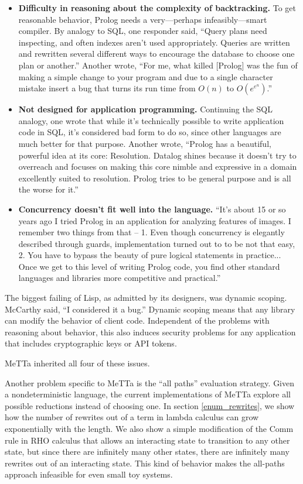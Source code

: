 \documentclass{article}
\begin{document}
\begin{itemize}
    \item {\bf Difficulty in reasoning about the complexity of backtracking.} To get reasonable behavior, Prolog needs a very---perhaps infeasibly---smart compiler.  By analogy to SQL, one responder said, ``Query plans need inspecting, and often indexes aren't used appropriately. Queries are written and rewritten several different ways to encourage the database to choose one plan or another.''  Another wrote, ``For me, what killed [Prolog] was the fun of making a simple change to your program and due to a single character mistake insert a bug that turns its run time from $O(n)$ to $O(e^{e^n})$.''
    \item {\bf Not designed for application programming.} Continuing the SQL analogy, one wrote that while it's technically possible to write application code in SQL, it's considered bad form to do so, since other languages are much better for that purpose.  Another wrote, ``Prolog has a beautiful, powerful idea at its core: Resolution. Datalog shines because it doesn't try to overreach and focuses on making this core nimble and expressive in a domain excellently suited to resolution. Prolog tries to be general purpose and is all the worse for it.''
    \item {\bf Concurrency doesn't fit well into the language.} ``It’s about 15 or so years ago I tried Prolog in an application for analyzing features of images. I remember two things from that – 1. Even though concurrency is elegantly described through guards, implementation turned out to to be not that easy, 2. You have to bypass the beauty of pure logical statements in practice... Once we get to this level of writing Prolog code, you find other standard languages and libraries more competitive and practical.''
\end{itemize}

The biggest failing of Lisp, as admitted by its designers, 
was dynamic scoping.  McCarthy said, ``I considered it a bug.''  Dynamic scoping means that any library can modify the behavior of client code.  Independent of the problems with reasoning about behavior, this also induces security problems for any application that includes cryptographic keys or API tokens.

MeTTa inherited all four of these issues.

Another problem specific to MeTTa is the ``all paths'' evaluation strategy.  Given a nondeterministic language, the current implementations of MeTTa explore all possible reductions instead of choosing one.  In section \ref{enum_rewrites}, we show how the number of rewrites out of a term in lambda calculus can grow exponentially with the length.  We also show a simple modification of the Comm rule in RHO calculus that allows an interacting state to transition to any other state, but since there are infinitely many other states, there are infinitely many rewrites out of an interacting state.  This kind of behavior makes the all-paths approach infeasible for even small toy systems.
\end{document}
